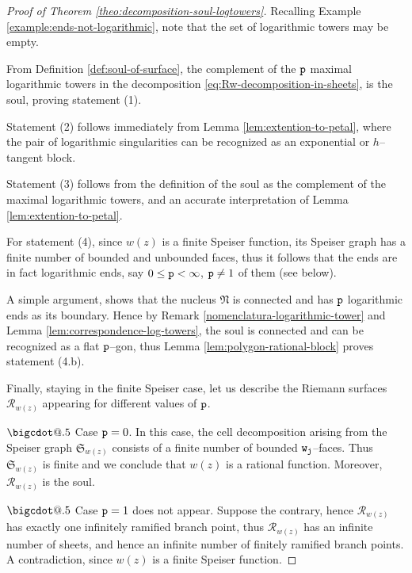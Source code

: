 \documentclass[final,3p,times]{elsarticle}
\makeatletter
\newcommand{\R}{\ensuremath{{\mathcal R}}}
\newcommand*\bigcdot{\mathpalette\bigcdot@{.5}}
\newcommand*\bigcdot@[2]{\mathbin{\vcenter{\hbox{\scalebox{#2}{$\m@th#1\bullet$}}}}}
\theoremstyle{definition}
\makeatother
\begin{document}
\begin{proof}[Proof of Theorem \ref{theo:decomposition-soul-logtowers}]
\noindent
Recalling Example \ref{example:ends-not-logarithmic}, 
note that the set of logarithmic towers may be empty.

\noindent
From Definition \ref{def:soul-of-surface}, the complement of the $\tt p$ maximal logarithmic towers 
in the decomposition \eqref{eq:Rw-decomposition-in-sheets}, is the soul, proving statement (1). 

\smallskip

Statement (2) follows immediately from Lemma 
\ref{lem:extention-to-petal}, 
where the pair of logarithmic singularities can be 
recognized
as an exponential or $h$--tangent block. 

\smallskip

Statement (3) follows from the definition of the soul as the complement of the maximal logarithmic towers,
and an accurate interpretation of Lemma \ref{lem:extention-to-petal}.

\smallskip

For statement (4), 
since $w(z)$ is a finite Speiser function, its Speiser graph has a finite number
of bounded and unbounded faces, thus it follows that the ends are in fact logarithmic ends, say $0\leq{\tt p}<\infty$, 
${\tt p}\neq 1$ of them (see below).

\noindent
A simple argument, 
shows that the nucleus $\mathfrak{N}$ is connected
and has $\tt p$ logarithmic ends as its boundary.
Hence by Remark \ref{nomenclatura-logarithmic-tower}
and Lemma \ref{lem:correspondence-log-towers},
the soul is connected and 
can be recognized as a flat $\tt p$--gon, 
thus Lemma \ref{lem:polygon-rational-block} proves
statement (4.b).

\smallskip

Finally, staying in the finite Speiser case, let us describe the Riemann surfaces 
$\R_{w(z)}$ appearing for different values of $\tt p$.

\noindent 
$\bigcdot$ 
Case ${\tt p}=0$. In this case, 
the cell decomposition arising from the Speiser graph $\mathfrak{S}_{w(z)}$
consists of a finite number of bounded $\tt w_j$--faces. 
Thus $\mathfrak{S}_{w(z)}$ is finite and we conclude that $w(z)$ is a rational function.
Moreover, $\R_{w(z)}$ is the soul.

\smallskip

\noindent 
$\bigcdot$ 
Case ${\tt p}=1$ does not appear. Suppose the contrary, hence $\R_{w(z)}$ 
has exactly one infinitely ramified branch point, thus $\R_{w(z)}$ has an 
infinite number of sheets, and hence an infinite number of finitely ramified 
branch points. 
A contradiction, since $w(z)$ is a finite Speiser function.


\end{proof}
\end{document}
